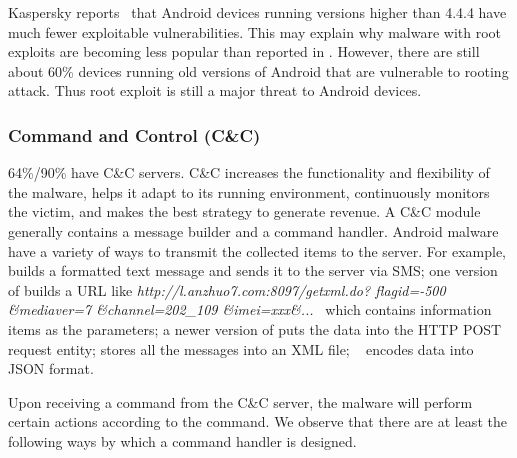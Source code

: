 Kaspersky reports~\cite{attackOnZygote}  that
Android devices running versions higher than 4.4.4
have much fewer exploitable vulnerabilities.
This may explain why malware with root exploits are becoming less 
popular than reported in \genome.
However, there are still about 60\% devices running old versions 
of Android that are vulnerable to rooting attack.
Thus root exploit is still a major threat to Android devices. 

\subsubsection{Command and Control (C\&C)}
\label{sec:profile:behavior:cc}

64\%/90\% have C\&C servers.
C\&C increases the functionality and flexibility of the malware,
helps it adapt to its running environment,
continuously monitors the victim,
and makes the best strategy to generate revenue.
A C\&C module generally contains
a message builder and a command handler.
Android malware have a variety of ways to transmit the 
collected items to the server. For example, 
\mbox{} builds a formatted text message and sends it to the server via SMS;
one version of  builds a URL like \linebreak
\textit{http://l.anzhuo7.com:8097/getxml.do? flagid=-500 \&mediaver=7 \&channel=202_109 \&imei=xxx\&...} \,
which contains information items as the parameters;
a newer version of  puts the data into the HTTP POST request entity;
 stores all the messages into an XML file;
~\cite{ruMms} encodes data into JSON format.


Upon receiving a command from the C\&C server, the malware
will perform certain actions according to the command.
We observe that there are at least the following ways by which
a command handler is designed. 

